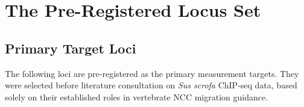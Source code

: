 \documentclass[10pt, a4paper]{article}
\begin{document}
\section{The Pre-Registered Locus Set}
\label{sec:loci}

\subsection{Primary Target Loci}

The following loci are pre-registered as the
primary measurement targets. They were selected
before literature consultation on \textit{Sus scrofa}
ChIP-seq data, based solely on their established
roles in vertebrate NCC migration guidance.
\end{document}
